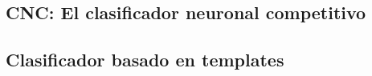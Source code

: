 \subsection{CNC: El clasificador neuronal competitivo}
\subsection{Clasificador basado en templates}
